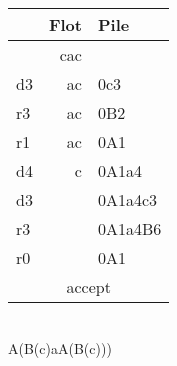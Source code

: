 \documentclass[12pt]{article}
\begin{document}
\begin{tabular}{l r|l}
 & Flot & Pile \\ 
\hline
 & cac & \\ 
d3 & ac & 0c3\\ 
r3 & ac & 0B2\\ 
r1 & ac & 0A1\\ 
d4 & c & 0A1a4\\ 
d3 &  & 0A1a4c3\\ 
r3 &  & 0A1a4B6\\ 
r0 &  & 0A1\\ 
\multicolumn{3}{c}{accept} \\ 
\end{tabular} \\ 

A(B(c)aA(B(c)))
\end{document}
